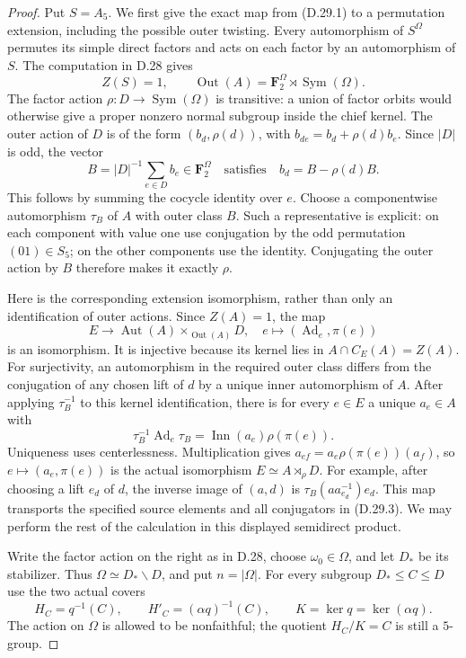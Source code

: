 \begin{proof}
Put $S=A_5$.  We first give the exact map from
\textup{(D.29.1)} to a permutation extension, including
the possible outer twisting.  Every automorphism of
$S^{\Omega}$ permutes its simple direct factors and
acts on each factor by an automorphism of $S$.
The computation in D.28 gives
\[
 Z(S)=1,\qquad
 \operatorname{Out}(A)=\mathbf F_2^{\Omega}
                         \rtimes\operatorname{Sym}(\Omega).
 \tag{D.29.4}
\]
The factor action $\rho:D\to\operatorname{Sym}(\Omega)$
is transitive: a union of factor orbits would otherwise
give a proper nonzero normal subgroup inside the chief
kernel.  The outer action of $D$ is of the form
$(b_d,\rho(d))$, with
$b_{de}=b_d+\rho(d)b_e$.
Since $|D|$ is odd, the vector
\[
 B=|D|^{-1}\sum_{e\in D}b_e\in\mathbf F_2^{\Omega}
 \quad\text{satisfies}\quad b_d=B-\rho(d)B.
 \tag{D.29.5}
\]
This follows by summing the cocycle identity over $e$.
Choose a componentwise automorphism $\tau_B$ of $A$
with outer class $B$.  Such a representative is explicit:
on each component with value one use conjugation by the
odd permutation $(01)\in S_5$; on the other components
use the identity.  Conjugating the outer action by $B$
therefore makes it exactly $\rho$.

Here is the corresponding extension isomorphism, rather
than only an identification of outer actions.  Since
$Z(A)=1$, the map
\[
 E\longrightarrow\operatorname{Aut}(A)
                       \times_{\operatorname{Out}(A)}D,
       \quad e\longmapsto(\operatorname{Ad}_e,\pi(e))
 \tag{D.29.6}
\]
is an isomorphism.  It is injective because its kernel
lies in $A\cap C_E(A)=Z(A)$.  For surjectivity, an
automorphism in the required outer class differs from
the conjugation of any chosen lift of $d$ by a unique
inner automorphism of $A$.
After applying $\tau_B^{-1}$ to this kernel identification,
there is for every $e\in E$ a unique $a_e\in A$ with
\[
 \tau_B^{-1}\operatorname{Ad}_e\tau_B
              =\operatorname{Inn}(a_e)\rho(\pi(e)).
 \tag{D.29.7}
\]
Uniqueness uses centerlessness.  Multiplication gives
$a_{ef}=a_e\rho(\pi(e))(a_f)$, so
$e\mapsto(a_e,\pi(e))$ is the actual isomorphism
$E\simeq A\rtimes_\rho D$.  For example, after choosing
a lift $e_d$ of $d$, the inverse image of $(a,d)$ is
$\tau_B(a a_{e_d}^{-1})e_d$.
This map transports the specified source elements and
all conjugators in \textup{(D.29.3)}.  We may perform
the rest of the calculation in this displayed
semidirect product.

Write the factor action on the right as in D.28,
choose $\omega_0\in\Omega$, and let $D_*$ be its
stabilizer.  Thus $\Omega\simeq D_*\backslash D$,
and put $n=|\Omega|$.  For every subgroup
$D_*\leq C\leq D$ use the two actual covers
\[
 H_C=q^{-1}(C),\qquad
 H'_C=(\alpha q)^{-1}(C),\qquad
 K=\ker q=\ker(\alpha q).
 \tag{D.29.8}
\]
The action on $\Omega$ is allowed to be nonfaithful;
the quotient $H_C/K=C$ is still a $5$-group.


\end{proof}
